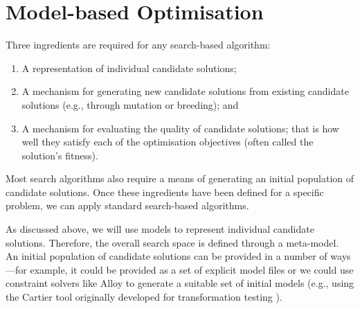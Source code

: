 \section{Model-based Optimisation}
\label{section:mde_optimisation}


	Three ingredients are required for any search-based algorithm: 
	\begin{enumerate}
		\item A representation of individual candidate solutions;
		\item A mechanism for generating new candidate solutions from existing candidate solutions (e.g., through mutation or breeding); and
		\item A mechanism for evaluating the quality of candidate solutions; that is how well they satisfy each of the optimisation objectives (often called the solution's fitness).
	\end{enumerate}
	Most search algorithms also require a means of generating an initial population of candidate solutions. Once these ingredients have been defined for a specific problem, we can apply standard 
	search-based algorithms.
	
	As discussed above, we will use models to represent individual candidate solutions. Therefore, the overall search space is defined through a meta-model. An
	initial population of candidate solutions can be provided in a number of ways---for example, it could be provided as a set of explicit model files or we could
	use constraint solvers like Alloy \cite{Jackson02} to generate a suitable set of initial models (e.g., using the Cartier tool originally developed for
	transformation testing \cite{Sen+08,Sen+09}).
	
